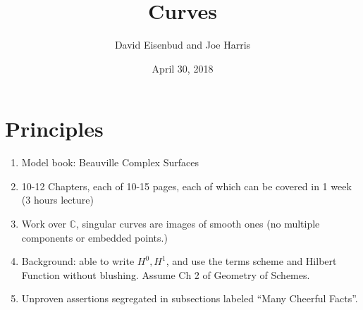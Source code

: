 \documentclass[12pt, leqno]{article}
\date{April 30, 2018}
\title{Curves}
\author{David Eisenbud and Joe Harris }
\def\CC{{\mathbb C}}
\begin{document}
\maketitle


\section*{Principles}
\begin{enumerate}

\item Model book: Beauville Complex Surfaces

\item 10-12 Chapters, each of 10-15 pages, each of which can be covered in 1 week (3 hours lecture)

\item Work over $\CC$, singular curves are images of smooth ones (no multiple components or embedded points.)

\item Background: able to write $H^0, H^1$, and use the terms scheme and Hilbert Function  without blushing. Assume Ch 2 of Geometry of Schemes.

\item Unproven assertions segregated in subsections labeled ``Many Cheerful Facts''.
\end{enumerate}
\end{document}
